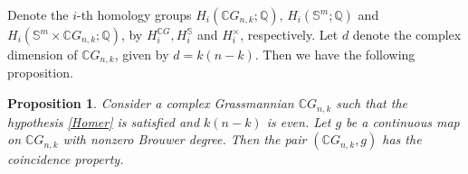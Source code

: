 \documentclass{amsart}
\newtheorem{proposition}[theorem]{Proposition}
\begin{document}
	
	
	Denote the $i$-th homology %
groups 
	$H_i(\mathbb{C}G_{n,k}; \mathbb{Q}), \, H_i(\mathbb{S}^m; \mathbb{Q})$ and 
	$H_i(\mathbb{S}^m \times \mathbb{C}G_{n,k}; \mathbb{Q})$, by %
$H_i^{\mathbb{C}G}, H_i^{\mathbb{S}}$ and $H_i^{\times}$, respectively. Let $d$ denote the complex dimension of $\mathbb CG_{n,k}$, given by $d = k(n - k)$. Then we have the following proposition.
	\begin{proposition}\label{CP of CGnk}
		Consider a complex Grassmannian $\mathbb{C}G_{n,k}$ such that the hypothesis \eqref{Homer} is satisfied and $k(n-k)$ is even. Let $g $ be a continuous map on $\mathbb{C}G_{n,k}$ with nonzero Brouwer degree. Then the pair $(\mathbb{C}G_{n,k}, g)$ has the coincidence property.
	\end{proposition}
	
\end{document}
